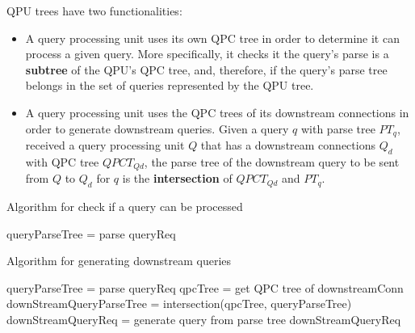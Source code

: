 QPU trees have two functionalities:
\begin{itemize}
  \item A query processing unit uses its own QPC tree in order to determine it can process a given query.
  More specifically, it checks it the query's parse is a \textbf{subtree} of the QPU's QPC tree,
  and, therefore, if the query's parse tree belongs in the set of queries represented by the QPU tree.

  \item A query processing unit uses the QPC trees of its downstream connections in order to generate downstream queries.
  Given a query $q$ with parse tree $PT_q$, received a query processing unit $Q$ that has a downstream connections $Q_d$
  with QPC tree $QPCT_{Qd}$, the parse tree of the downstream query to be sent from $Q$ to $Q_d$ for $q$ is the
  \textbf{intersection} of $QPCT_{Qd}$ and $PT_q$.
\end{itemize}

\begin{algorithm}
\caption{Algorithm for check if a query can be processed}
\label{algo:can_process_query}
\begin{algorithmic}
\State queryParseTree = parse queryReq
\State {}
\EndFunction
\end{algorithmic}
\end{algorithm}


\begin{algorithm}
\caption{Algorithm for generating downstream queries}
\label{algo:generate_downsrream}
\begin{algorithmic}
\State queryParseTree = parse queryReq
\State qpcTree = get QPC tree of downstreamConn
\State downStreamQueryParseTree = intersection(qpcTree, queryParseTree)
\State downStreamQueryReq = generate query from parse tree
\State \Return downStreamQueryReq
\EndFunction
\end{algorithmic}
\end{algorithm}




